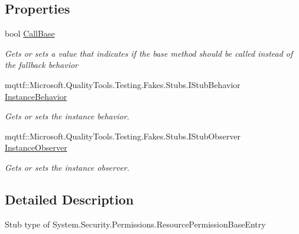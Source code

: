 \subsection*{Properties}
\begin{DoxyCompactItemize}
\item 
bool \hyperlink{class_system_1_1_security_1_1_permissions_1_1_fakes_1_1_stub_resource_permission_base_entry_aef8fe02ddb10c12f2c7fb5cab6f1fb39}{Call\-Base}
\begin{DoxyCompactList}\small\item\em Gets or sets a value that indicates if the base method should be called instead of the fallback behavior\end{DoxyCompactList}\item 
mqttf\-::\-Microsoft.\-Quality\-Tools.\-Testing.\-Fakes.\-Stubs.\-I\-Stub\-Behavior \hyperlink{class_system_1_1_security_1_1_permissions_1_1_fakes_1_1_stub_resource_permission_base_entry_ae25d24e5917ed8269055d5e1e2bc7908}{Instance\-Behavior}
\begin{DoxyCompactList}\small\item\em Gets or sets the instance behavior.\end{DoxyCompactList}\item 
mqttf\-::\-Microsoft.\-Quality\-Tools.\-Testing.\-Fakes.\-Stubs.\-I\-Stub\-Observer \hyperlink{class_system_1_1_security_1_1_permissions_1_1_fakes_1_1_stub_resource_permission_base_entry_a97753114d577f80c13fbcc74027b2305}{Instance\-Observer}
\begin{DoxyCompactList}\small\item\em Gets or sets the instance observer.\end{DoxyCompactList}\end{DoxyCompactItemize}


\subsection{Detailed Description}
Stub type of System.\-Security.\-Permissions.\-Resource\-Permission\-Base\-Entry



